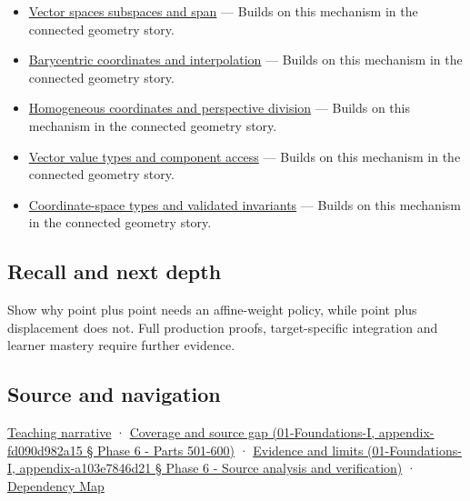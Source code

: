 \begin{itemize}
\tightlist
\item
  \hyperref[appendix-173b52c063ae]{Vector spaces subspaces and span} --- Builds on this mechanism in the connected geometry story.
\item
  \hyperref[appendix-02b9d9a81dca]{Barycentric coordinates and interpolation} --- Builds on this mechanism in the connected geometry story.
\item
  \hyperref[appendix-cb3b26862282]{Homogeneous coordinates and perspective division} --- Builds on this mechanism in the connected geometry story.
\item
  \hyperref[appendix-37a39984ba66]{Vector value types and component access} --- Builds on this mechanism in the connected geometry story.
\item
  \hyperref[appendix-380a220e2529]{Coordinate-space types and validated invariants} --- Builds on this mechanism in the connected geometry story.
\end{itemize}

\subsection{Recall and next depth}\label{recall-and-next-depth}

Show why point plus point needs an affine-weight policy, while point plus displacement does not. Full production proofs, target-specific integration and learner mastery require further evidence.

\subsection{Source and navigation}\label{source-and-navigation}

\href{Continuous\%20Notes/Computing\%20Foundations\%20-\%20From\%20Bits\%20to\%20C++\%20and\%20Systems\%20APIs\#An\%20arrow\%20is\%20not\%20the\%20address\%20written\%20beside\%20it}{Teaching narrative} · \href{}{Coverage and source gap (01-Foundations-I, appendix-fd090d982a15 § Phase 6 - Parts 501-600)} · \href{}{Evidence and limits (01-Foundations-I, appendix-a103e7846d21 § Phase 6 - Source analysis and verification)} · \hyperref[appendix-4ad47bdd269a]{Dependency Map}
